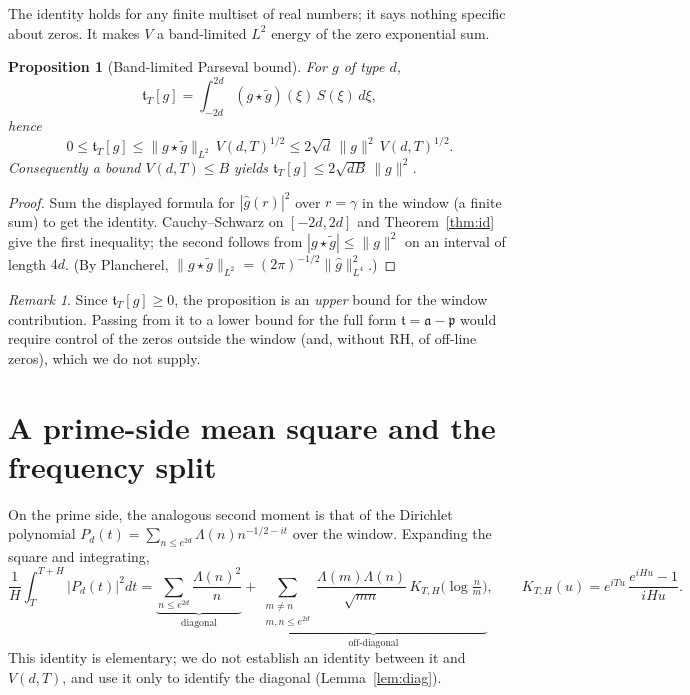\documentclass[11pt]{amsart}
\newtheorem{proposition}[theorem]{Proposition}
\theoremstyle{definition}
\theoremstyle{remark}
\newtheorem{remark}[theorem]{Remark}
\newcommand{\fa}{\mathfrak a}
\newcommand{\fp}{\mathfrak p}
\newcommand{\ft}{\mathfrak t}
\begin{document}
The identity holds for any finite multiset of real numbers; it says nothing
specific about zeros. It makes $V$ a band-limited $L^2$ energy of the zero
exponential sum.

\begin{proposition}[Band-limited Parseval bound]\label{prop:parseval}
For $g$ of type $d$,
\[
\ft_T[g]=\int_{-2d}^{2d}(g\star\tilde g)(\xi)\,S(\xi)\,d\xi,
\]
hence
\[
0\le\ft_T[g]\le\|g\star\tilde g\|_{L^2}\,V(d,T)^{1/2}\le2\sqrt d\,\|g\|^2\,V(d,T)^{1/2}.
\]
Consequently a bound $V(d,T)\le B$ yields $\ft_T[g]\le2\sqrt{dB}\,\|g\|^2$.
\end{proposition}
\begin{proof}
Sum the displayed formula for $|\widehat g(r)|^2$ over $r=\gamma$ in the window
(a finite sum) to get the identity. Cauchy--Schwarz on $[-2d,2d]$ and
Theorem~\ref{thm:id} give the first inequality; the second follows from
$|g\star\tilde g|\le\|g\|^2$ on an interval of length $4d$. (By Plancherel,
$\|g\star\tilde g\|_{L^2}=(2\pi)^{-1/2}\|\widehat g\|_{L^4}^2$.)
\end{proof}

\begin{remark}
Since $\ft_T[g]\ge0$, the proposition is an \emph{upper} bound for the window
contribution. Passing from it to a lower bound for the full form $\ft=\fa-\fp$
would require control of the zeros outside the window (and, without RH, of
off-line zeros), which we do not supply.
\end{remark}

\section{A prime-side mean square and the frequency split}
On the prime side, the analogous second moment is that of the Dirichlet
polynomial $P_d(t)=\sum_{n\le e^{2d}}\Lambda(n)n^{-1/2-it}$ over the window.
Expanding the square and integrating,
\begin{equation}\label{eq:exp}
\frac1H\int_T^{T+H}|P_d(t)|^2dt
=\underbrace{\sum_{n\le e^{2d}}\frac{\Lambda(n)^2}{n}}_{\text{diagonal}}
+\underbrace{\sum_{\substack{m\ne n\\ m,n\le e^{2d}}}\frac{\Lambda(m)\Lambda(n)}{\sqrt{mn}}\,
K_{T,H}\!\bigl(\log\tfrac nm\bigr)}_{\text{off-diagonal}},\qquad
K_{T,H}(u)=e^{iTu}\,\frac{e^{iHu}-1}{iHu}.
\end{equation}
This identity is elementary; we do not establish an identity between it and
$V(d,T)$, and use it only to identify the diagonal (Lemma~\ref{lem:diag}).
\end{document}
